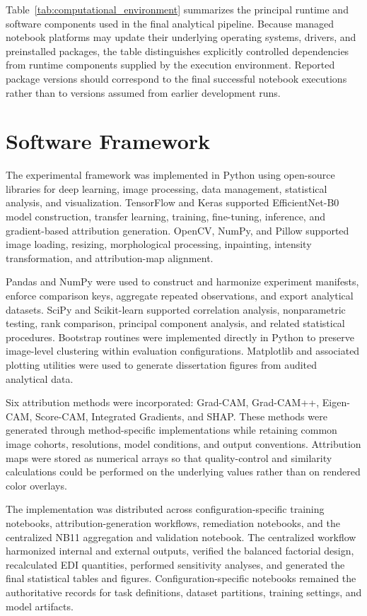 Table~\ref{tab:computational_environment} summarizes the principal runtime and software components used in the final analytical pipeline. Because managed notebook platforms may update their underlying operating systems, drivers, and preinstalled packages, the table distinguishes explicitly controlled dependencies from runtime components supplied by the execution environment. Reported package versions should correspond to the final successful notebook executions rather than to versions assumed from earlier development runs.




\section{Software Framework}

The experimental framework was implemented in Python using open-source libraries for deep learning, image processing, data management, statistical analysis, and visualization. TensorFlow and Keras supported EfficientNet-B0 model construction, transfer learning, training, fine-tuning, inference, and gradient-based attribution generation. OpenCV, NumPy, and Pillow supported image loading, resizing, morphological processing, inpainting, intensity transformation, and attribution-map alignment.

Pandas and NumPy were used to construct and harmonize experiment manifests, enforce comparison keys, aggregate repeated observations, and export analytical datasets. SciPy and Scikit-learn supported correlation analysis, nonparametric testing, rank comparison, principal component analysis, and related statistical procedures. Bootstrap routines were implemented directly in Python to preserve image-level clustering within evaluation configurations. Matplotlib and associated plotting utilities were used to generate dissertation figures from audited analytical data.

Six attribution methods were incorporated: Grad-CAM, Grad-CAM++, Eigen-CAM, Score-CAM, Integrated Gradients, and SHAP. These methods were generated through method-specific implementations while retaining common image cohorts, resolutions, model conditions, and output conventions. Attribution maps were stored as numerical arrays so that quality-control and similarity calculations could be performed on the underlying values rather than on rendered color overlays.

The implementation was distributed across configuration-specific training notebooks, attribution-generation workflows, remediation notebooks, and the centralized NB11 aggregation and validation notebook. The centralized workflow harmonized internal and external outputs, verified the balanced factorial design, recalculated EDI quantities, performed sensitivity analyses, and generated the final statistical tables and figures. Configuration-specific notebooks remained the authoritative records for task definitions, dataset partitions, training settings, and model artifacts.

